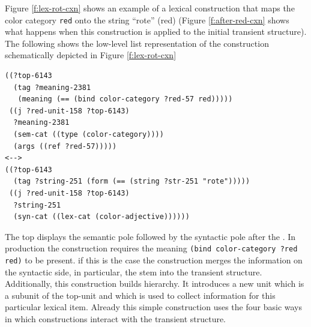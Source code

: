 Figure \ref{f:lex-rot-cxn} shows an example of a lexical construction that maps 
the color category {\footnotesize\tt red} onto the string ``rote'' (red)
(Figure \ref{f:after-red-cxn} shows what happens
when this construction is applied to the initial transient structure). 
The following shows the low-level list representation of the construction
schematically depicted in Figure \ref{f:lex-rot-cxn}
\begin{example}
\label{e:red-lex-list}
\begin{footnotesize}
\begin{Verbatim}[commandchars=\\\{\}]
((?top-6143
  (tag ?meaning-2381 
   (meaning (== (bind color-category ?red-57 red)))))
 ((j ?red-unit-158 ?top-6143)
  ?meaning-2381
  (sem-cat ((type (color-category))))
  (args ((ref ?red-57)))))
<-->
((?top-6143
  (tag ?string-251 (form (== (string ?str-251 "rote")))))
 ((j ?red-unit-158 ?top-6143)
  ?string-251
  (syn-cat ((lex-cat (color-adjective))))))
  \end{Verbatim}
\end{footnotesize}
\end{example}
The top displays the semantic pole followed by the syntactic pole after the 
{\footnotesize\tt <-->}. In production the construction requires
the meaning {\footnotesize\tt (bind color-category ?red red)} to be present.
if this is the case the construction merges the information 
on the syntactic side, in particular, the stem into the transient structure.
Additionally, this construction builds hierarchy. It introduces a new unit
which is a subunit of the top-unit and which is used to collect
information for this particular lexical item. Already this simple 
construction uses the four basic ways in which constructions
interact with the transient structure. 
